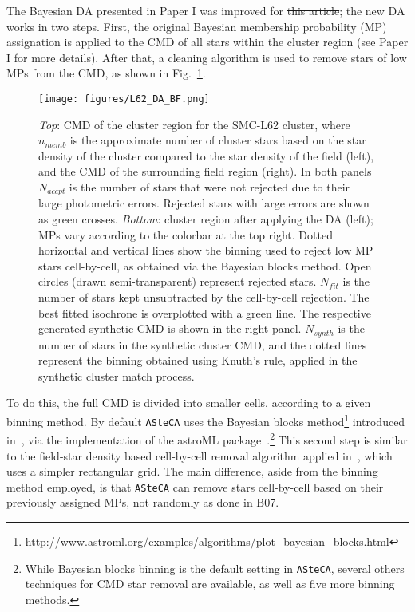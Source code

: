 \documentclass[draft]{aa}
\providecommand{\DIFaddtex}[1]{{\protect\color{blue}\uwave{#1}}} %
\providecommand{\DIFdeltex}[1]{{\protect\color{red}\sout{#1}}}                      %
\providecommand{\DIFaddbegin}{} %
\providecommand{\DIFaddend}{} %
\providecommand{\DIFdelbegin}{} %
\providecommand{\DIFdelend}{} %
\providecommand{\DIFadd}[1]{\texorpdfstring{\DIFaddtex{#1}}{#1}} %
\providecommand{\DIFdel}[1]{\texorpdfstring{\DIFdeltex{#1}}{}} %
\begin{document}
The Bayesian DA presented in Paper I was improved for \DIFdelbegin \DIFdel{this article}\DIFdelend \DIFaddbegin \DIFadd{the present analysis}\DIFaddend ; the
new DA works in two steps. First, the original Bayesian membership probability 
(MP) assignation is applied to the CMD of all stars within the cluster region 
(see Paper I for more details).\@
%
After that, a cleaning algorithm is used to remove stars of low MPs from the
CMD, as shown in Fig.~\ref{fig:DA_BF}.
%
\begin{figure}
\centering
\texttt{[image: figures/L62\_DA\_BF.png]}
\caption{\emph{Top}: CMD of the cluster region for the SMC-L62 cluster, where
$n_{memb}$ is the approximate number of cluster stars based on the star density
of the cluster compared to the star density of the field (left), and the CMD of
the surrounding field region (right).
In both panels $N_{accpt}$ is the number of stars that were not rejected due to
their large photometric errors. Rejected stars with large errors are shown as
green crosses.
%
\emph{Bottom}: cluster region after applying the DA (left); MPs vary
according to the colorbar at the top right. Dotted horizontal and vertical lines
show the binning used to reject low MP stars cell-by-cell, as obtained via the
Bayesian blocks method. Open circles (drawn semi-transparent) represent rejected
stars.
$N_{fit}$ is the number of stars kept unsubtracted by the cell-by-cell
rejection. The best fitted isochrone is overplotted with a green line. 
The respective generated synthetic CMD is shown in the right panel. $N_{synth}$
is the number of stars in the synthetic cluster CMD, and the dotted lines
represent the binning obtained using Knuth's rule, applied in the synthetic
cluster match process.}
\label{fig:DA_BF}
\end{figure}
%
To do this, the full CMD is divided into smaller cells, according to a
given binning method. By default \texttt{ASteCA} uses the Bayesian blocks
method\footnote{\url{http://www.astroml.org/examples/algorithms/plot_bayesian_blocks.html}}
introduced in~\cite{Scargle_2013}, via the implementation of the astroML
package~\citep{Vanderplas_2012}.\footnote{While Bayesian blocks binning is the
default setting in \texttt{ASteCA}, several others techniques for CMD star
removal are available, as well as five more binning methods.}
This second step is similar to the field-star density based cell-by-cell removal
algorithm applied in~\citet[][B07]{Bonatto_2007}, which uses a simpler
rectangular grid.
%
The main difference, aside from the binning method employed, is that
\texttt{ASteCA} can remove stars cell-by-cell based on their previously assigned
MPs, not randomly as done in B07.
\end{document}
